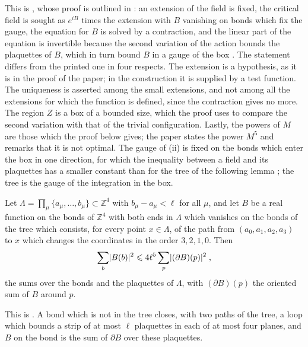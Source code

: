 \documentclass[11pt]{preprint}
\DeclarePairedDelimiter{\abs}{\lvert}{\rvert}
\numberwithin{equation}{section}
\begin{document}
This is \cite[Proposition~1, p.~194]{BalabanLFR1}, whose proof is outlined in \cite[pp.~357--359]{BalabanLFR2}: an extension of the field is fixed, the critical field is sought as $e^{iB}$ times the extension with $B$ vanishing on bonds which fix the gauge, the equation for $B$ is solved by a contraction, and the linear part of the equation is invertible because the second variation of the action bounds the plaquettes of $B$, which in turn bound $B$ in a gauge of the box \cite[(1.7)--(1.9), (1.12), (1.13)]{BalabanLFR2}. The statement differs from the printed one in four respects. The extension is a hypothesis, as it is in the proof of the paper; in the construction it is supplied by a test function. The uniqueness is asserted among the small extensions, and not among all the extensions for which the function is defined, since the contraction gives no more. The region $Z$ is a box of a bounded size, which the proof uses to compare the second variation with that of the trivial configuration. Lastly, the powers of $M$ are those which the proof below gives; the paper states the power $M^5$ and remarks that it is not optimal. The gauge of (ii) is fixed on the bonds which enter the box in one direction, for which the inequality between a field and its plaquettes has a smaller constant than for the tree of the following lemma \cite[p.~358]{BalabanLFR2}; the tree is the gauge of the integration in the box.

\begin{lemma}\label{lem:axial-poincare}
Let $\Lambda = \prod_\mu\{ a_\mu, \dots, b_\mu \} \subset \mathbb Z^4$ with $b_\mu - a_\mu < \ell$ for all $\mu$, and let $B$ be a real function on the bonds of $\mathbb Z^4$ with both ends in $\Lambda$ which vanishes on the bonds of the tree which consists, for every point $x \in \Lambda$, of the path from $(a_0, a_1, a_2, a_3)$ to $x$ which changes the coordinates in the order $3, 2, 1, 0$. Then
\begin{equation}\label{eq:axial-poincare}
    \sum_b\abs{B(b)}^2 \leqslant 4\ell^5\sum_p\abs{(\partial B)(p)}^2\;,
\end{equation}
the sums over the bonds and the plaquettes of $\Lambda$, with $(\partial B)(p)$ the oriented sum of $B$ around $p$.
\end{lemma}

This is \cite[(1.8), p.~358]{BalabanLFR2}. A bond which is not in the tree closes, with two paths of the tree, a loop which bounds a strip of at most $\ell$ plaquettes in each of at most four planes, and $B$ on the bond is the sum of $\partial B$ over these plaquettes.
\end{document}
